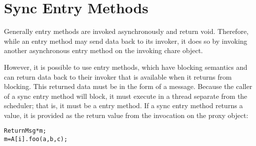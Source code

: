 
\section{Sync Entry Methods}
\label{sync}

Generally entry methods are invoked asynchronously and return void. Therefore,
while an entry method may send data back to its invoker, it does so by invoking
another asynchronous entry method on the invoking chare object.

However, it is possible to use  entry methods, which have blocking
semantics and can return data back to their invoker that is available when it
returns from blocking. This returned data must be in the form of a \charmpp
message. Because the caller of a sync entry method will block, it must execute
in a thread separate from the scheduler; that is, it must be a 
entry method. If a sync entry method returns a value, it is provided as the
return value from the invocation on the proxy object:

\begin{alltt}
 ReturnMsg* m;
 m = A[i].foo(a, b, c);
\end{alltt}
